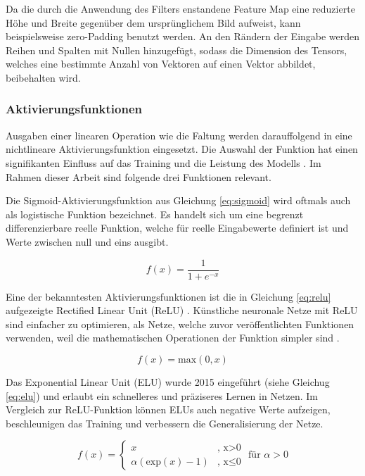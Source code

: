 \mypar Da die durch die Anwendung des Filters enstandene Feature Map eine reduzierte Höhe und Breite gegenüber dem ursprünglichem Bild aufweist, kann beispielsweise zero-Padding benutzt werden. An den Rändern der Eingabe werden Reihen und Spalten mit Nullen hinzugefügt, sodass die Dimension des Tensors, welches eine bestimmte Anzahl von Vektoren auf einen Vektor abbildet, beibehalten wird. \cite{an-introduction-to-cnns}


\subsubsection{Aktivierungsfunktionen}
Ausgaben einer linearen Operation wie die Faltung werden darauffolgend in eine nichtlineare Aktivierungsfunktion eingesetzt. Die Auswahl der Funktion hat einen signifikanten Einfluss auf das Training und die Leistung des Modells \cite{searching-for-act-functions}. Im Rahmen dieser Arbeit sind folgende drei Funktionen relevant. 

\mypar Die Sigmoid-Aktivierungsfunktion aus Gleichung \ref{eq:sigmoid} wird oftmals auch als logistische Funktion bezeichnet. Es handelt sich um eine begrenzt differenzierbare reelle Funktion, welche für reelle Eingabewerte definiert ist und Werte zwischen null und eins ausgibt. \cite{activation-functions}

\begin{equation}\label{eq:sigmoid}
f(x)=\frac{1}{1+e^{-x}}
\end{equation}

 Eine der bekanntesten Aktivierungsfunktionen ist die in Gleichung \ref{eq:relu} aufgezeigte Rectified Linear Unit (ReLU) \cite{imagenet-class-w-deep-cnns}. Künstliche neuronale Netze mit ReLU sind einfacher zu optimieren, als Netze, welche zuvor veröffentlichten Funktionen verwenden, weil die mathematischen Operationen der Funktion simpler sind \cite{searching-for-act-functions}.

\begin{equation}\label{eq:relu}
f(x)=\text{max}(0,x)
\end{equation}

\mypar Das Exponential Linear Unit (ELU) wurde 2015 eingeführt (siehe Gleichug \ref{eq:elu}) und erlaubt ein schnelleres und präziseres Lernen in Netzen. Im Vergleich zur ReLU-Funktion können ELUs auch negative Werte aufzeigen, beschleunigen das Training und verbessern die Generalisierung der Netze. \cite{elus}

\begin{equation}\label{eq:elu}
f(x)=
\begin{cases}
x & \text{, x} > \text{0} \\
\alpha(\text{exp}(x)-1) & \text{, x} \leqslant \text{0}
\end{cases}
\text{	für } \alpha > \text{0}
\end{equation}


